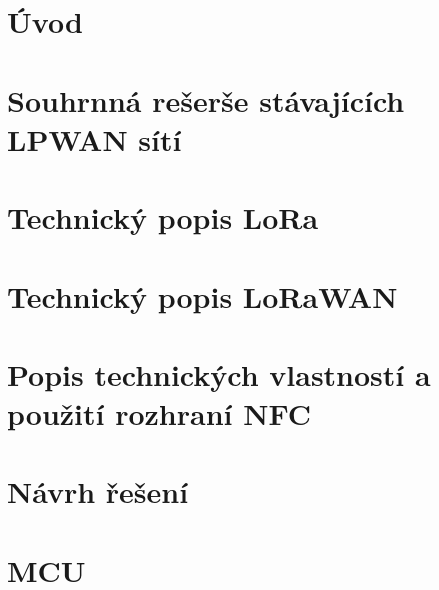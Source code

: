 \documentclass[czech,bachelor]{diploma}
\begin{document}
\MakeTitlePages


\listoffigures
\clearpage

\listoftables
\clearpage

\chapter{Úvod}



\chapter{Souhrnná rešerše stávajících LPWAN sítí}



\chapter{Technický popis LoRa}



\chapter{Technický popis LoRaWAN}



\chapter{Popis technických vlastností a použití rozhraní NFC}



\chapter{Návrh řešení}



\chapter{MCU}
\end{document}

